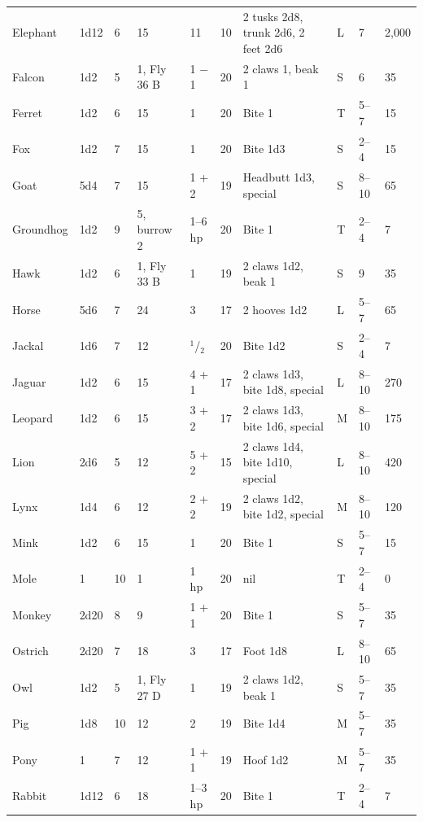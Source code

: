 \begin{minipage}{\columnwidth}
\begin{tabular}{p{}p{}p{}p{}p{}p{}p{}p{}p{}p{}}
Elephant	& 1d12	& 6	& 15	& 11	& 10	& 2 tusks 2d8, trunk 2d6, 2 feet 2d6		& L	& 7 & 2,000	\\ %
\rowcolor[gray]{.9}Falcon	& 1d2	& 5	& 1, Fly 36 B	& 1 $-$ 1	& 20	& 2 claws 1, beak 1	& S	& 6	& 35 \\ %
Ferret	& 1d2	& 6	& 15	& 1	& 20	& Bite 1	& T	& 5--7	& 15 \\
\rowcolor[gray]{.9}Fox		& 1d2	& 7	& 15	& 1	& 20	& Bite 1d3	& S	& 2--4	& 15 \\
Goat	& 5d4	& 7	& 15	& 1 + 2	& 19	& Headbutt 1d3, special	& S	& 8--10	& 65 \\ %
\rowcolor[gray]{.9}Groundhog	& 1d2	& 9	& 5, burrow 2	& 1--6 hp	& 20	& Bite 1	& T	& 2--4	& 7 \\
Hawk	& 1d2	& 6	& 1, Fly 33 B	& 1	& 19	& 2 claws 1d2, beak 1	& S	& 9	& 35 \\ %
\rowcolor[gray]{.9}Horse	& 5d6	& 7	& 24	& 3		& 17	& 2 hooves 1d2	& L	& 5--7	& 65 \\	%
Jackal	& 1d6	& 7	& 12	& $^1$/$_2$	& 20	& Bite 1d2	& S	& 2--4	& 7 \\		
\rowcolor[gray]{.9}Jaguar	& 1d2	& 6	& 15	& 4 + 1	& 17	& 2 claws 1d3, bite 1d8, special	& L	& 8--10	& 270 \\ %
Leopard	& 1d2	& 6	& 15	& 3 + 2	& 17	& 2 claws 1d3, bite 1d6, special	& M	& 8--10	& 175 \\ %
\rowcolor[gray]{.9}Lion	& 2d6	& 5	& 12	& 5 + 2	& 15	& 2 claws 1d4, bite 1d10, special	& L	& 8--10	& 420 \\ %
Lynx	& 1d4	& 6	& 12	& 2 + 2	& 19	& 2 claws 1d2, bite 1d2, special	& M	& 8--10	& 120 \\ %
\rowcolor[gray]{.9}Mink	& 1d2	& 6	& 15	& 1	& 20	& Bite 1	& S	& 5--7	& 15 \\
Mole	& 1	& 10	& 1	& 1 hp	& 20	& nil	& T	& 2--4	& 0 \\
\rowcolor[gray]{.9}Monkey	& 2d20	& 8	& 9	& 1 + 1	& 20	& Bite 1	& S	& 5--7	& 35 \\
Ostrich	& 2d20	& 7	& 18	& 3	& 17	& Foot 1d8	& L	& 8--10	& 65 \\
\rowcolor[gray]{.9}Owl		& 1d2	& 5	& 1, Fly 27 D	& 1	& 19	& 2 claws 1d2, beak 1	& S	& 5--7	& 35 \\ %
Pig 	& 1d8	& 10	& 12	& 2	& 19	& Bite 1d4	& M	& 5--7	& 35 \\
\rowcolor[gray]{.9}Pony	& 1	& 7	& 12	& 1 + 1	& 19	& Hoof 1d2	& M	& 5--7	& 35 \\
Rabbit	& 1d12	& 6	& 18	& 1--3 hp	& 20	& Bite 1	& T	& 2--4	& 7 \\

\end{tabular}
\end{minipage}
